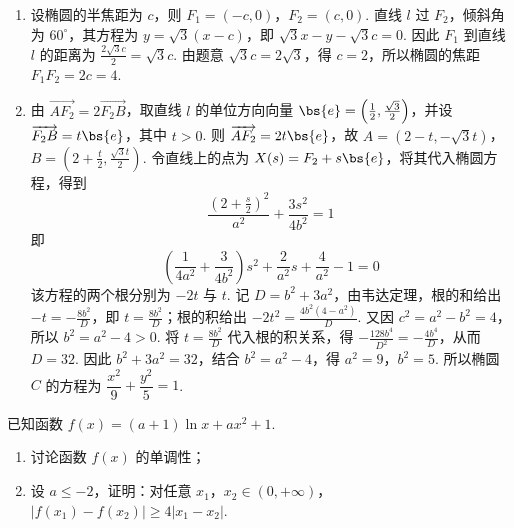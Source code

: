 \begin{solution}
\begin{enumerate}
\item 设椭圆的半焦距为 \(c\)，则 \(F_1=(-c,0)\)，\(F_2=(c,0)\). 直线 \(l\) 过 \(F_2\)，倾斜角为 \(60^\circ\)，其方程为 \(y=\sqrt{3}(x-c)\)，即 \(\sqrt{3}x-y-\sqrt{3}c=0\). 因此 \(F_1\) 到直线 \(l\) 的距离为 \(\frac{2\sqrt{3}c}{2}=\sqrt{3}c\). 由题意 \(\sqrt{3}c=2\sqrt{3}\)，得 \(c=2\)，所以椭圆的焦距 \(F_1F_2=2c=4\).
\item 由 \(\overrightarrow{AF_2}=2\overrightarrow{F_2B}\)，取直线 \(l\) 的单位方向向量 \(\bs{e}=\left(\frac{1}{2},\frac{\sqrt{3}}{2}\right)\)，并设 \(\overrightarrow{F_2B}=t\bs{e}\)，其中 \(t>0\). 则 \(\overrightarrow{AF_2}=2t\bs{e}\)，故
\(A=\left(2-t,-\sqrt{3}t\right)\)，\(B=\left(2+\frac{t}{2},\frac{\sqrt{3}t}{2}\right)\).
令直线上的点为 \(X(s)=F_2+s\bs{e}\)，将其代入椭圆方程，得到
\[
\frac{(2+\frac{s}{2})^2}{a^2}+\frac{3s^2}{4b^2}=1
\]
即
\[
\left(\frac{1}{4a^2}+\frac{3}{4b^2}\right)s^2+\frac{2}{a^2}s+\frac{4}{a^2}-1=0
\]
该方程的两个根分别为 \(-2t\) 与 \(t\). 记 \(D=b^2+3a^2\)，由韦达定理，根的和给出 \(-t=-\frac{8b^2}{D}\)，即 \(t=\frac{8b^2}{D}\)；根的积给出 \(-2t^2=\frac{4b^2(4-a^2)}{D}\). 又因 \(c^2=a^2-b^2=4\)，所以 \(b^2=a^2-4>0\). 将 \(t=\frac{8b^2}{D}\) 代入根的积关系，得 \(-\frac{128b^4}{D^2}=-\frac{4b^4}{D}\)，从而 \(D=32\). 因此 \(b^2+3a^2=32\)，结合 \(b^2=a^2-4\)，得 \(a^2=9\)，\(b^2=5\). 所以椭圆 \(C\) 的方程为 \(\dfrac{x^2}{9}+\dfrac{y^2}{5}=1\).
\end{enumerate}
\end{solution}

\begin{problem}
已知函数 \(f(x)=(a+1)\ln x+ax^2+1\).

\begin{enumerate}
\item 讨论函数 \(f(x)\) 的单调性；
\item 设 \(a\leqslant -2\)，证明：对任意 \(x_1\)，\(x_2\in(0,+\infty)\)，\(|f(x_1)-f(x_2)|\geqslant 4|x_1-x_2|\).
\end{enumerate}
\end{problem}

